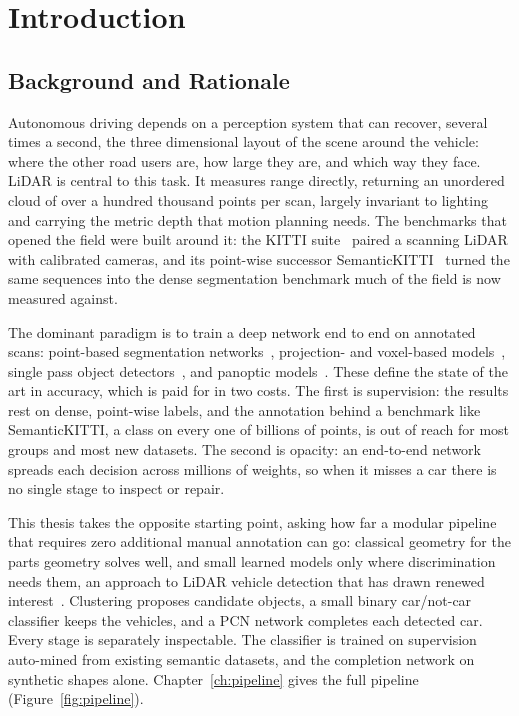 \documentclass[a4paper,12pt]{report}
\begin{document}
\chapter{Introduction}
\label{ch:introduction}

\section{Background and Rationale}
\label{sec:intro-background}

Autonomous driving depends on a perception system that can recover, several times a
second, the three dimensional layout of the scene around the vehicle: where the other
road users are, how large they are, and which way they face. LiDAR is central to this
task. It measures range directly, returning an unordered cloud of over a hundred
thousand points per scan, largely invariant to lighting and carrying the metric depth
that motion planning needs. The benchmarks that opened the field were built around it:
the KITTI suite~\cite{geiger2012we} paired a scanning LiDAR with calibrated cameras,
and its point-wise successor SemanticKITTI~\cite{Behley_2019_ICCV} turned the same
sequences into the dense segmentation benchmark much of the field is now measured
against.

The dominant paradigm is to train a deep network end to end on annotated scans:
point-based segmentation networks~\cite{Qi_2017_CVPR,NIPS2017_d8bf84be,Hu_2020_CVPR},
projection- and voxel-based models~\cite{10.1109/ICRA.2018.8462926,milioto2019rangenet++,zhu2021cylindrical},
single pass object detectors~\cite{lang2019pointpillars,yin2021centerpoint}, and
panoptic models~\cite{zhou2021panopticpolarnet,hong2021dsnet}. These define the state
of the art in accuracy, which is paid for in two costs. The first is supervision: the
results rest on dense, point-wise labels, and the annotation behind a benchmark like
SemanticKITTI, a class on every one of billions of points, is out of reach for
most groups and most new datasets. The second is opacity: an end-to-end network spreads
each decision across millions of weights, so when it misses a car there is no single
stage to inspect or repair.

This thesis takes the opposite starting point, asking how far a modular pipeline that
requires zero additional manual annotation can go: classical geometry for the parts
geometry solves well, and small learned models only where discrimination needs them, an
approach to LiDAR vehicle detection that has drawn renewed interest~\cite{lim2025longrange}.
Clustering proposes candidate objects, a small binary car/not-car
classifier keeps the vehicles, and a PCN network completes each detected car. Every
stage is separately inspectable. The classifier is trained on supervision auto-mined
from existing semantic datasets, and the completion network on synthetic shapes alone. Chapter~\ref{ch:pipeline} gives the full pipeline
(Figure~\ref{fig:pipeline}).
\end{document}
